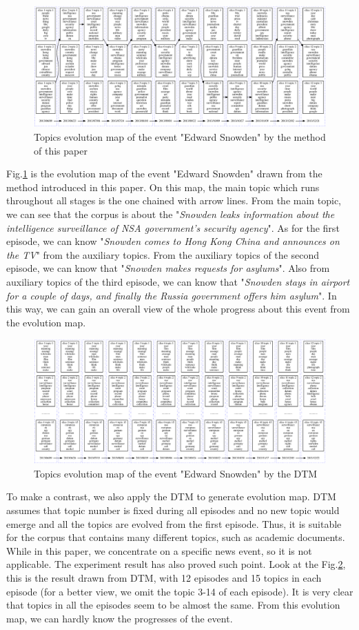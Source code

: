 \documentclass[runningheads,a4paper]{llncs}
\begin{document}
\begin{figure}[htb]
	\centering
	\includegraphics[width=12cm]{evolution_lda_kmeans}
	\caption{Topics evolution map of the event "Edward Snowden" by the method of this paper}
	\label{evolution:our}
\end{figure}
Fig.\ref{evolution:our} is the evolution map of the event "Edward Snowden" drawn from the method introduced in this paper. On this map, the main topic which runs throughout all stages is the one chained with arrow lines. From the main topic, we can see that the corpus is about the "\emph{Snowden leaks information about the intelligence surveillance of NSA government's security agency}". As for the first episode, we can know "\emph{Snowden comes to Hong Kong China and announces on the TV}" from the auxiliary topics. From the auxiliary topics of the second episode, we can know that "\emph{Snowden makes requests for asylums}". Also from auxiliary topics of the third episode, we can know that "\emph{Snowden stays in airport for a couple of days, and finally the Russia government offers him asylum}". In this way, we can gain an overall view of the whole progress about this event from the evolution map.

\begin{figure}[htb]
	\centering
	\includegraphics[width=12cm]{evolution_dtm_15}
	\caption{Topics evolution map of the event "Edward Snowden" by the DTM}
	\label{evolution:dtm}
\end{figure}
To make a contrast, we also apply the DTM to generate evolution map. DTM assumes that topic number is fixed during all episodes and no new topic would emerge and all the topics are evolved from the first episode. Thus, it is suitable for the corpus that contains many different topics, such as academic documents. While in this paper, we concentrate on a specific news event, so it is not applicable. The experiment result has also proved such point. Look at the Fig.\ref{evolution:dtm}, this is the result drawn from DTM, with 12 episodes and 15 topics in each episode (for a better view, we omit the topic 3-14 of each episode). It is very clear that topics in all the episodes seem to be almost the same. From this evolution map, we can hardly know the progresses of the event.
\end{document}
